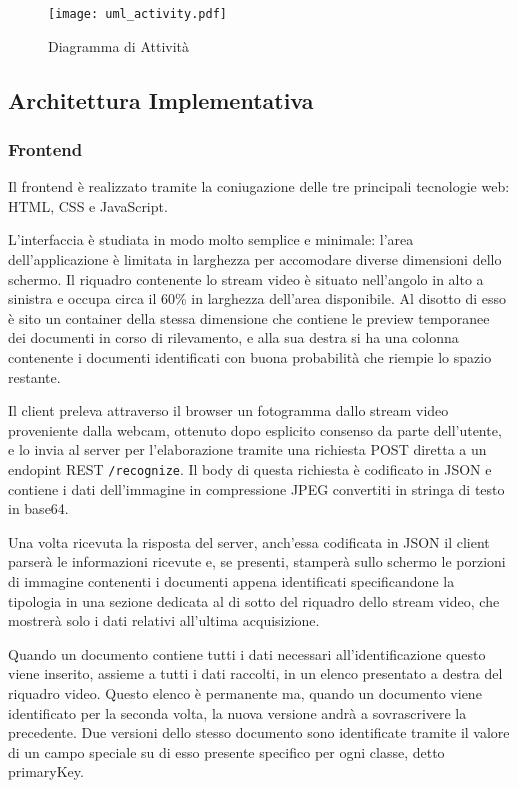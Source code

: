 \documentclass[12pt,a4paper]{article}
\begin{document}
\begin{figure}[H]
    \caption{Diagramma di Attività}
    \centering
    \texttt{[image: uml\_activity.pdf]}
\end{figure}

\subsection{Architettura Implementativa}

\subsubsection{Frontend}

Il frontend è realizzato tramite la coniugazione delle tre principali
tecnologie web: HTML, CSS e JavaScript.

L'interfaccia è studiata in modo molto semplice e minimale: l'area
dell'applicazione è limitata in larghezza per accomodare diverse
dimensioni dello schermo. Il riquadro contenente lo stream video è
situato nell'angolo in alto a sinistra e occupa circa il 60\% in
larghezza dell'area disponibile. Al disotto di esso è sito un container
della stessa dimensione che contiene le preview temporanee dei documenti
in corso di rilevamento, e alla sua destra si ha una colonna contenente
i documenti identificati con buona probabilità che riempie lo spazio
restante.

Il client preleva attraverso il browser un fotogramma dallo stream video
proveniente dalla webcam, ottenuto dopo esplicito consenso da parte
dell'utente, e lo invia al server per l'elaborazione tramite una
richiesta POST diretta a un endopint REST \texttt{/recognize}. Il body
di questa richiesta è codificato in JSON e contiene i dati dell'immagine
in compressione JPEG convertiti in stringa di testo in base64.

Una volta ricevuta la risposta del server, anch'essa codificata in JSON
il client parserà le informazioni ricevute e, se presenti, stamperà
sullo schermo le porzioni di immagine contenenti i documenti appena
identificati specificandone la tipologia in una sezione dedicata al di
sotto del riquadro dello stream video, che mostrerà solo i dati relativi
all'ultima acquisizione.

Quando un documento contiene tutti i dati necessari all'identificazione
questo viene inserito, assieme a tutti i dati raccolti, in un elenco
presentato a destra del riquadro video. Questo elenco è permanente ma,
quando un documento viene identificato per la seconda volta, la nuova
versione andrà a sovrascrivere la precedente. Due versioni dello stesso
documento sono identificate tramite il valore di un campo speciale su di
esso presente specifico per ogni classe, detto primaryKey.
\end{document}
